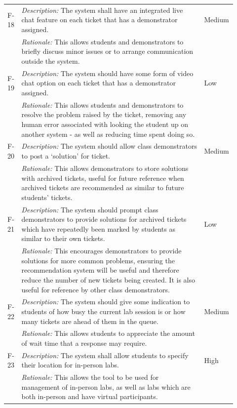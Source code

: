 \documentclass[a4paper,11pt]{article}
\begin{document}
\begin{table}[H]
\begin{tabular}{|p{0.05\linewidth} | p{0.78\linewidth} |p{0.09\linewidth}|}
   \hline\hline
 F-18 & \textit{Description:} The system shall have an integrated live chat feature on each ticket that has a demonstrator assigned. & Medium\\
  \cline{2-2}
  & \textit{Rationale:} This allows students and demonstrators to briefly discuss minor issues or to arrange communication outside the system. & \\

   \hline\hline
 F-19 & \textit{Description:} The system should have some form of video chat option on each ticket that has a demonstrator assigned. & Low\\
  \cline{2-2}
  & \textit{Rationale:} This allows students and demonstrators to resolve the problem raised by the ticket, removing any human error associated with looking the student up on another system - as well as reducing time spent doing so. & \\

   \hline\hline
 F-20 & \textit{Description:} The system should allow class demonstrators to post a `solution' for ticket. & Medium\\
  \cline{2-2}
  & \textit{Rationale:} This allows demonstrators to store solutions with archived tickets, useful for future reference when archived tickets are recommended as similar to future students' tickets. & \\

   \hline\hline
 F-21 & \textit{Description:} The system should prompt class demonstrators to provide solutions for archived tickets which have repeatedly been marked by students as similar to their own tickets. & Low\\
  \cline{2-2}
  & \textit{Rationale:} This encourages demonstrators to provide solutions for more common problems, ensuring the recommendation system will be useful and therefore reduce the number of new tickets being created. It is also useful for reference by other class demonstrators. & \\

  
     \hline\hline
 F-22 & \textit{Description:} The system should give some indication to students of how busy the current lab session is or how many tickets are ahead of them in the queue. & Medium\\
  \cline{2-2}
  & \textit{Rationale:} This allows students to appreciate the amount of wait time that a response may require. & \\

     \hline\hline
 F-23 & \textit{Description:} The system shall allow students to specify their location for in-person labs. & High\\
  \cline{2-2}
  & \textit{Rationale:} This allows the tool to be used for management of in-person labs, as well as labs which are both in-person and have virtual participants. & \\
 

\end{tabular}
\end{table}
\end{document}
